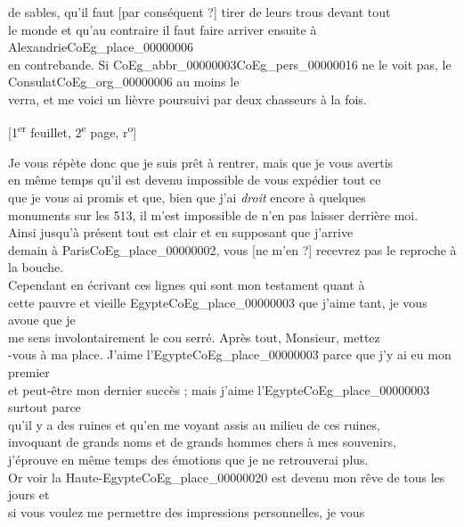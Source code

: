 \documentclass{book}
\begin{document}
de sables, qu’il faut {[par conséquent ?]} tirer de leurs trous devant tout\\
le monde et qu’au contraire il faut faire arriver ensuite à Alexandrie\gls{CoEg_place_00000006}\\
en contrebande. Si \gls{CoEg_abbr_00000003}\gls{CoEg_pers_00000016} ne le voit pas, le Consulat\gls{CoEg_org_00000006} au moins le\\
verra, et me voici un lièvre poursuivi par deux chasseurs à la fois.
{\footnotesize\begin{center} {[1\textsuperscript{er} feuillet, 2\textsuperscript{e} page, r\textsuperscript{o}]}\end{center}}
\indent Je vous répète donc que je suis prêt à rentrer, mais que je vous avertis\\
en même temps qu’il est devenu impossible de vous expédier tout ce\\
que je vous ai promis et que, bien que j’ai \textit{droit} encore à quelques\\
monuments sur les 513, il m’est impossible de n’en pas laisser derrière moi.\\
\indent Ainsi jusqu’à présent tout est clair et en supposant que j’arrive\\
demain à Paris\gls{CoEg_place_00000002}, vous {[ne m’en ?]} recevrez pas le reproche à la bouche.\\
\indent Cependant en écrivant ces lignes qui sont mon testament quant à\\
cette pauvre et vieille Egypte\gls{CoEg_place_00000003} que j’aime tant, je vous avoue que je\\
me sens involontairement le cou serré. Après tout, Monsieur, mettez\\
-vous à ma place. J’aime l’Egypte\gls{CoEg_place_00000003} parce que j’y ai eu mon premier\\
et peut-être mon dernier succès ; mais j’aime l’Egypte\gls{CoEg_place_00000003} surtout parce\\
qu’il y a des ruines et qu’en me voyant assis au milieu de ces ruines,\\
invoquant de grands noms et de grands hommes chers à mes souvenirs,\\
j’éprouve en même temps des émotions que je ne retrouverai plus.\\
Or voir la Haute-Egypte\gls{CoEg_place_00000020} est devenu mon rêve de tous les jours et\\
si vous voulez me permettre des impressions personnelles, je vous\\
\end{document}
